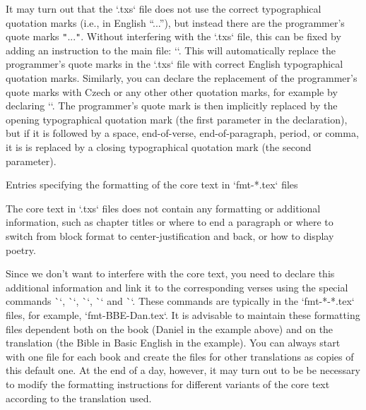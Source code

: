 It may turn out that the `.txs` file does not use the correct typographical quotation marks (i.e., in English “...”), but instead there are the programmer's quote marks {\tt"}...{\tt"}. 
Without interfering with the `.txs` file, this can be fixed by adding an instruction to
the main file:
``.
This will automatically replace the programmer's quote marks in the `.txs` file with correct English  typographical quotation marks. 
Similarly, you can declare the replacement of the programmer's quote marks
with Czech or any other other quotation marks, for example by declaring
``.
The programmer's quote mark is then implicitly
replaced by the opening typographical quotation mark (the first parameter in the 
declaration), but if it is followed by a space, end-of-verse, end-of-paragraph, period, 
or comma, it is is replaced by a closing typographical quotation mark (the second 
parameter).

\secc[fmt] Entries specifying the formatting of the core text in `fmt-*.tex` files

The core text in `.txs` files does not contain any formatting or additional information, 
such as chapter titles or where to end a paragraph or where to switch from block format 
to center-justification   and back, or how to display poetry.


Since we don't want to interfere with the core text, 
you need to declare this additional information and link it to the corresponding verses using the special commands \`\fmtadd`, \`\fmtpre`, \`\fmtins`, \`\fmtfont` and \`\fmtkeep`. 
These commands are typically in the `fmt-*-*.tex` files,
for example, `fmt-BBE-Dan.tex`. It is advisable to maintain these formatting files
dependent both on the book (Daniel in the example above) and on the translation (the Bible in Basic English in the example). 
You can always start with one file for each book and  create the files for  other translations as copies of this default one.  At the end of a day, 
however, it may turn out to be be necessary to modify the formatting instructions for different variants of the core text according to the translation used.


